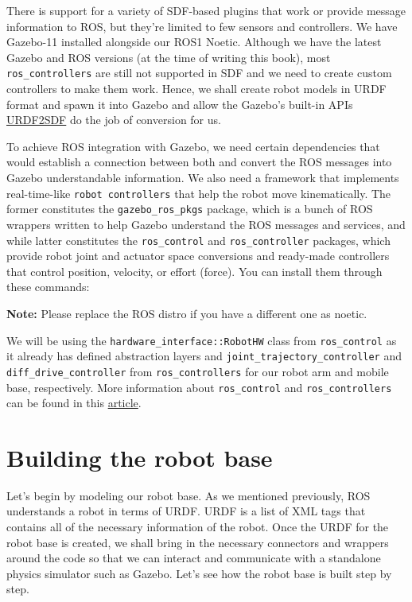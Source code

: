\documentclass[letterpaper,pdftex]{article}
\begin{document}
There is support for a variety of SDF-based plugins that work or provide message information to ROS, but they're limited to few sensors and controllers. We have Gazebo-11 installed alongside our ROS1  Noetic. Although we have the latest Gazebo and ROS versions (at the time of writing this book), most \verb|ros_controllers| are still not supported in SDF and we need to create custom controllers to make them work.  Hence, we shall create robot models in URDF format and spawn it into Gazebo and allow the Gazebo's built-in APIs \href{http://osrf-distributions.s3.amazonaws.com/sdformat/api/6.0.0/classsdf_1_1URDF2SDF.html}{URDF2SDF} do the job of conversion for us.



To achieve ROS integration with Gazebo, we need certain dependencies that would establish a connection between both and convert the ROS messages into Gazebo understandable information. We also need a framework that implements real-time-like \verb|robot controllers| that help the robot move kinematically. The former constitutes the \verb|gazebo_ros_pkgs| package, which is a bunch of ROS wrappers written to help Gazebo understand the ROS messages and services, and while latter constitutes the \verb|ros_control| and \verb|ros_controller| packages, which provide robot joint and actuator space conversions and ready-made controllers that control position, velocity, or effort (force). You can install them through these commands:




\textbf{Note:} Please replace the ROS distro if you have a different one as noetic.

We will be using the \verb|hardware_interface::RobotHW| class from \verb|ros_control| as it already has defined abstraction layers and \verb|joint_trajectory_controller| and \verb|diff_drive_controller| from \verb|ros_controllers| for our robot arm and mobile base, respectively. More information about \verb|ros_control| and \verb|ros_controllers| can be found in this \href{http://www.theoj.org/joss-papers/joss.00456/10.21105.joss.00456.pdf}{article}.

\section{Building the robot base}

Let's begin by modeling our robot base. As we mentioned previously, ROS understands a robot in terms of URDF. URDF is a list of XML tags that contains all of the necessary information of the robot. Once the URDF for the robot base is created, we shall bring in the necessary connectors and wrappers around the code so that we can interact and communicate with a standalone physics simulator such as Gazebo. Let's see how the robot base is built step by step.
\end{document}
